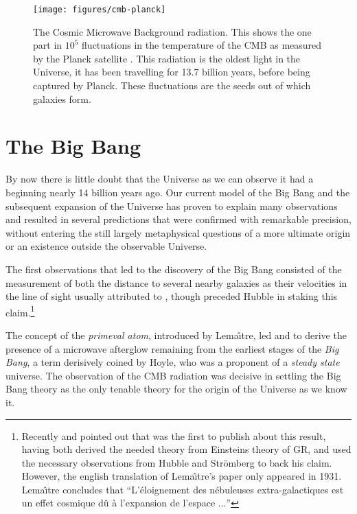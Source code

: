 \clearpage
\begin{figure}[ht]
\centering
\texttt{[image: figures/cmb-planck]}
\caption{The Cosmic Microwave Background radiation. This shows the one part in $10^5$ fluctuations in the temperature of the CMB as measured by the Planck satellite \citep{Planck2013-pp}.  This radiation is the oldest light in the Universe, it has been travelling for 13.7 billion years, before being captured by Planck. These fluctuations are the seeds out of which galaxies form.}\label{fig:cmb}
\end{figure}

\section{The Big Bang}
By now there is little doubt that the Universe as we can observe it had a beginning nearly 14 billion years ago. Our current model of the Big Bang and the subsequent expansion of the Universe has proven to explain many observations and resulted in several predictions that were confirmed with remarkable precision, without entering the still largely metaphysical questions of a more ultimate origin or an existence outside the observable Universe.

The first observations that led to the discovery of the Big Bang consisted of the measurement of both the distance to several nearby galaxies as their velocities in the line of sight usually attributed to \citet{Hubble1929}, though \citet{Lemaitre1927} preceded Hubble in staking this claim.\footnote{Recently \citet{Livio2011} and \citet{VanDenBergh2011} pointed out that \citet{Lemaitre1927} was the first to  publish about this result, having both derived the needed theory from Einsteins theory of GR, and used the necessary observations from Hubble and Str\"omberg to back his claim.  However, the english translation of Lema\^{\i}tre's paper only appeared in 1931. Lema\^{\i}tre concludes that ``L'\'eloignement des n\'ebuleuses extra-galactiques est un effet cosmique d\^u \`a l'expansion de l'espace $\dots$''}

The concept of the \emph{primeval atom}, introduced by Lema\^{\i}tre, led \citet{Alpher1948} and \citet{Gamov1948} to derive the presence of a microwave afterglow remaining from the earliest stages of the \emph{Big Bang}, a term derisively coined by Hoyle, who was a proponent of a \emph{steady state} universe. The observation of the \ac{CMB} radiation \citep{Penzias1965,Dicke1965} was decisive in settling the Big Bang theory as the only tenable theory for the origin of the Universe as we know it.

